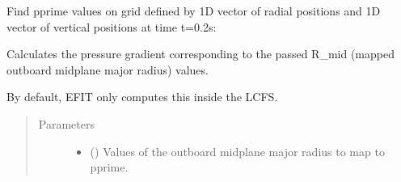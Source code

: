 \documentclass[letterpaper,10pt,english]{sphinxmanual}
\begin{document}
\begin{fulllineitems}
\begin{fulllineitems}
\begin{sphinxVerbatim}[commandchars=\\\{\}]
  \PYG{p}{[} \PYG{p}{]} \PYG{p}{[} \PYG{p}{]} \PYG{p}{[} \PYG{p}{]} 
\end{sphinxVerbatim}

Find pprime values on grid defined by 1D vector of radial positions 
and 1D vector of vertical positions  at time t=0.2s:

\begin{sphinxVerbatim}[commandchars=\\\{\}]
     
\end{sphinxVerbatim}

\end{fulllineitems}


\begin{fulllineitems}
\label{\detokenize{eqtools:eqtools.core.Equilibrium.rmid2pprime}}
Calculates the pressure gradient corresponding to the passed R\_mid (mapped outboard midplane major radius) values.

By default, EFIT only computes this inside the LCFS.
\begin{quote}\begin{description}
\item[{Parameters}] \leavevmode\begin{itemize}
\item {} 
 () \textendash{} Values of the outboard midplane
major radius to map to pprime.


\end{itemize}
\end{description}
\end{quote}
\end{fulllineitems}
\end{fulllineitems}
\end{document}
